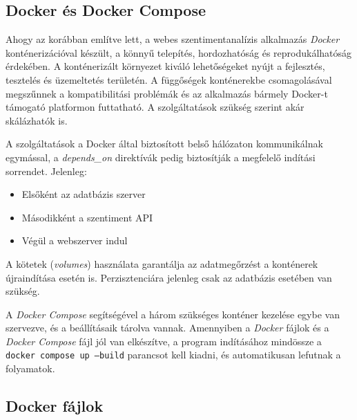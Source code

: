 \documentclass[12pt]{article}
\begin{document}
\subsection{Docker és Docker Compose}

Ahogy az korábban említve lett, a webes szentimentanalízis alkalmazás \textit{Docker} konténerizációval készült, a könnyű telepítés, hordozhatóság és reprodukálhatóság érdekében. A konténerizált környezet kiváló lehetőségeket nyújt a fejlesztés, tesztelés és üzemeltetés területén. A függőségek konténerekbe csomagolásával megszűnnek a kompatibilitási problémák és az alkalmazás bármely Docker-t támogató platformon futtatható. A szolgáltatások szükség szerint akár skálázhatók is. 

A szolgáltatások a Docker által biztosított belső hálózaton kommunikálnak egymással, a \textit{depends\_on} direktívák pedig biztosítják a megfelelő indítási sorrendet. Jelenleg:

\begin{itemize}
    \item Elsőként az adatbázis szerver
    \item Másodikként a szentiment API
    \item Végül a webszerver indul
\end{itemize}

A kötetek (\textit{volumes}) használata garantálja az adatmegőrzést a konténerek újraindítása esetén is. Perzisztenciára jelenleg csak az adatbázis esetében van szükség.

A \textit{Docker Compose} segítségével a három szükséges konténer kezelése egybe van szervezve, és a beállításaik tárolva vannak. Amennyiben a \textit{Docker} fájlok és a \textit{Docker Compose} fájl jól van elkészítve, a program indításához mindössze a \texttt{docker compose up --build} parancsot kell kiadni, és automatikusan lefutnak a folyamatok.

\subsection{Docker fájlok}
\end{document}
